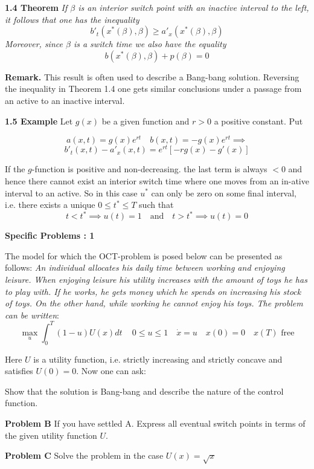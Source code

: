 \documentclass{amsart}
\begin{document}
\noindent
{\bf{1.4 Theorem}}\emph{ If $\beta$ is an interior switch point with an 
inactive interval to the left, it follows that one has the  inequality}
\[
b'_t(x^*(\beta),\beta)\geq a'_x(x^*(\beta),\beta)
\]
\emph{Moreover, since $\beta$ is a switch time we also have the equality}
\[
b(x^*(\beta),\beta)+p(\beta)=0
\]
\medskip


\noindent
{\bf Remark.} This result is often used to describe
a Bang-bang solution.
Reversing the inequality in Theorem  1.4 one gets similar 
conclusions under  a passage from an active to an inactive interval.
\medskip


\noindent
{\bf 1.5 Example}
Let $g(x)$ be a given function and $r>0$ a positive constant.
Put

\[
a(x,t)=g(x)e^{rt}\quad b(x,t)=-g(x)e^{rt}\implies
\]
\[
b'_t(x,t)-a'_x(x,t)=e^{rt}[ -rg(x)-g'(x)]
\]
\medskip

\noindent
If the $g$-function is positive and non-decreasing. 
the last term is always $<0$ and hence there cannot exist an interior switch time
where one moves from an in-ative interval to an active.
So in this case $u^*$ can only be zero on some final interval, i.e. there exists a unique $0\leq t^*\leq T$ such that
\[
t<t^*\implies u(t)=1\quad \text{and}\quad t>t^*\implies u(t)=0
\]
\bigskip


\centerline {\bf Specific Problems : 1}


\bigskip
\noindent 
The model for which the OCT-problem is posed below can
be  presented as follows: 
\emph{An individual allocates his daily time between working and enjoying leisure. When enjoying leisure
his utility increases with the amount of toys he has to play with. If he works, he gets money which he spends on increasing his stock of toys. On the other hand, while working he cannot enjoy his toys. The problem can be written}: 
\[
\max_u\int_0^T(1-u)U(x)dt\quad\,0\leq u\leq 1
\quad \dot x=u\quad x(0)=0\quad x(T)\,\, \text{free}
\]
\medskip

\noindent 
Here $U$ is  a utility function, i.e. strictly increasing 
and strictly concave and satisfies $U(0)=0$. Now one can ask:
\medskip

 Show that the solution is Bang-bang and describe the nature of the control function.
\medskip 
 
 \noindent
 {\bf Problem B} If you have settled A. Express 
 all eventual switch points in terms of the given utility function $U$.
\medskip

\noindent
{\bf Problem C} Solve the problem in the case $U(x)=\sqrt{x}$
\bigskip  
\end{document}
